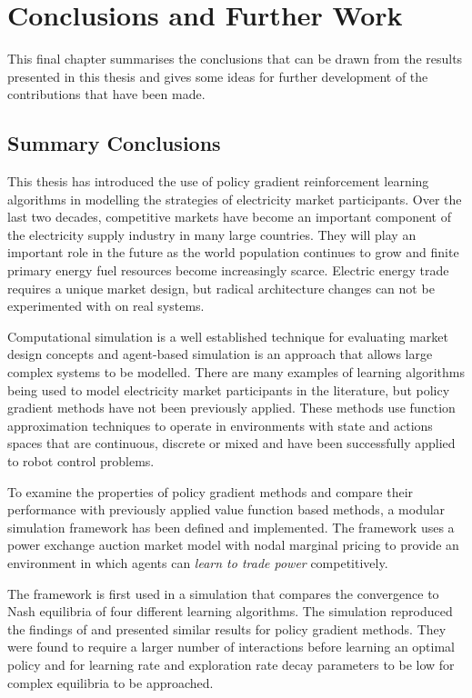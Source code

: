 \chapter{Conclusions and Further Work}
\label{ch:conclusion}
This final chapter summarises the conclusions that can be drawn from the
results presented in this thesis and gives some ideas for further development
of the contributions that have been made.

\section{Summary Conclusions}
This thesis has introduced the use of policy gradient reinforcement learning
algorithms in modelling the strategies of electricity market participants. Over
the last two decades, competitive markets have become an important component of
the electricity supply industry in many large countries.  They will play an
important role in the future as the world population continues to grow and
finite primary energy fuel resources become increasingly scarce.  Electric
energy trade requires a unique market design, but radical architecture changes
can not be experimented with on real systems.

Computational simulation is a well established technique for evaluating market
design concepts and agent-based simulation is an approach that allows large
complex systems to be modelled.  There are many examples of learning algorithms
being used to model electricity market participants in the literature, but
policy gradient methods have not been previously applied.  These
methods use function approximation techniques to operate in environments
with state and actions spaces that are continuous, discrete or mixed and have
been successfully applied to robot control problems.

To examine the properties of policy gradient methods and compare their
performance with previously applied value function based methods, a modular
simulation framework has been defined and implemented.  The framework uses a
power exchange auction market model with nodal marginal pricing to provide an
environment in which agents can \textit{learn to trade power} competitively.

The framework is first used in a simulation that compares the convergence to
Nash equilibria of four different learning algorithms.  The simulation
reproduced the findings of  and presented similar results
for policy gradient methods.  They were found to require a
larger number of interactions before learning an optimal policy and for learning
rate and exploration rate decay parameters to be low for complex
equilibria to be approached.

